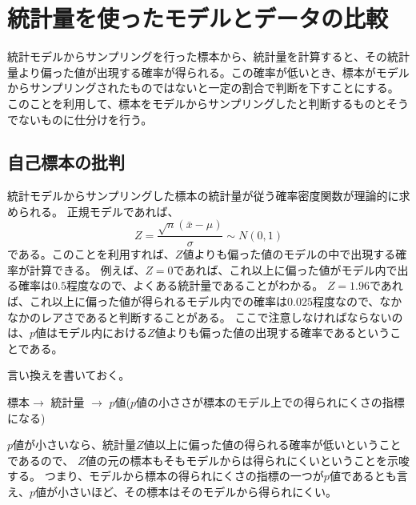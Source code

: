 \chapter{統計量を使ったモデルとデータの比較}
統計モデルからサンプリングを行った標本から、統計量を計算すると、その統計量より偏った値が出現する確率が得られる。この確率が低いとき、標本がモデルからサンプリングされたものではないと一定の割合で判断を下すことにする。
このことを利用して、標本をモデルからサンプリングしたと判断するものとそうでないものに仕分けを行う。




\section{自己標本の批判}
統計モデルからサンプリングした標本の統計量が従う確率密度関数が理論的に求められる。
正規モデルであれば、
\begin{equation*}
    Z = \frac{\sqrt{n}(\bar{x}-\mu)}{\sigma} \sim N(0,1)
\end{equation*}
である。このことを利用すれば、$Z$値よりも偏った値のモデルの中で出現する確率が計算できる。
例えば、$Z=0$であれば、これ以上に偏った値がモデル内で出る確率は$0.5$程度なので、よくある統計量であることがわかる。
$Z=1.96$であれば、これ以上に偏った値が得られるモデル内での確率は$0.025$程度なので、なかなかのレアさであると判断することがある。
ここで注意しなければならないのは、$p$値はモデル内における$Z$値よりも偏った値の出現する確率であるということである。

言い換えを書いておく。
\begin{center}
    標本$\rightarrow$ 統計量 $\rightarrow$ $p$値($p$値の小ささが標本のモデル上での得られにくさの指標になる)
\end{center}


$p$値が小さいなら、統計量$Z$値以上に偏った値の得られる確率が低いということであるので、
$Z$値の元の標本もそもモデルからは得られにくいということを示唆する。
つまり、モデルから標本の得られにくさの指標の一つが$p$値であるとも言え、$p$値が小さいほど、その標本はそのモデルから得られにくい。


